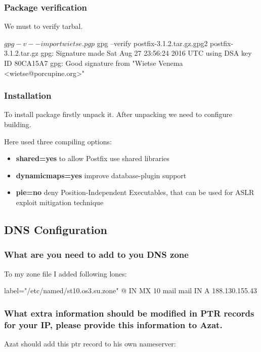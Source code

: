 \documentclass[a4paper,11pt]{article}
\begin{document}
\subsubsection{Package verification}

We must to verify tarbal.
\begin{bashcode}
$ gpg -v --import wietse.pgp
$ gpg --verify postfix-3.1.2.tar.gz.gpg2 postfix-3.1.2.tar.gz
gpg: Signature made Sat Aug 27 23:56:24 2016 UTC using DSA key ID 80CA15A7
gpg: Good signature from "Wietse Venema <wietse@porcupine.org>"
\end{bashcode}

\subsubsection{Installation}
To install package firstly unpack it. After unpacking we need to configure building.

Here used three compiling options:
\begin{itemize}
    \item \textbf{shared=yes} to allow Postfix use shared libraries
    \item \textbf{dynamicmaps=yes} improve database-plugin support
    \item \textbf{pie=no} deny Position-Independent Executables, that can be used for ASLR exploit mitigation technique
\end{itemize}

\subsection{DNS Configuration}
\subsubsection{What are you need to add to you DNS zone}
To my zone file I added following lones: 
\begin{bashcode*}{label="/etc/named/st10.os3.su.zone"}
@               IN      MX      10      mail
mail            IN      A               188.130.155.43
\end{bashcode*}

\subsubsection{What extra information should be modified in PTR records for your IP, please provide this information to Azat.}
Azat should add this ptr record to his own nameserver: 
\end{document}
